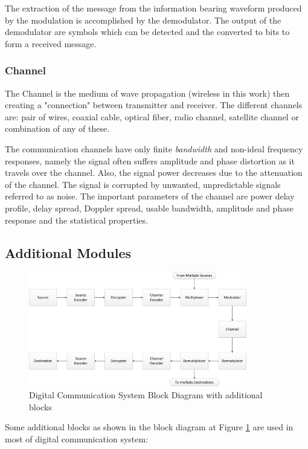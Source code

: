 The extraction of the message from the information bearing waveform produced by
the modulation is accomplished by the demodulator. The output of the demodulator
are symbols which can be detected and the converted to bits to form a received
message.

\subsubsection{Channel}

The Channel is the medium of wave propagation (wireless in this work) then
creating a "connection" between transmitter and receiver. The different channels
are: pair of wires, coaxial cable, optical fiber, radio channel, satellite
channel or combination of any of these.

The communication channels have only finite \emph{bandwidth} and non-ideal
frequency responses, namely the signal often suffers amplitude and phase
distortion as it travels over the channel. Also, the signal power decreases due
to the attenuation of the channel. The signal is corrupted by unwanted,
unpredictable signals referred to as noise. The important parameters of the
channel are power delay profile, delay spread, Doppler spread, usable bandwidth,
amplitude and phase response and the statistical properties.

\subsection{Additional Modules}

\begin{figure}[htbp]
    \centering
    \includegraphics[width=0.85\textwidth]{./figures/digicom_plus}
    \caption{ Digital Communication System Block Diagram with additional blocks
    \label{fig:digicomplus}}
\end{figure}

Some additional blocks as shown in the block diagram  at Figure \ref{fig:digicomplus}
are used in most of digital communication system:

